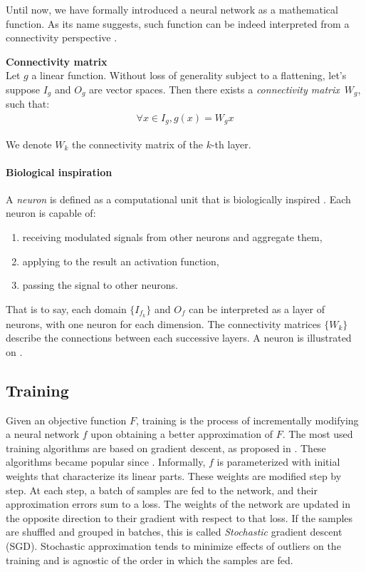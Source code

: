 Until now, we have formally introduced a neural network as a mathematical function. As its name suggests, such function can be indeed interpreted from a connectivity perspective \citep{lecun-87}.

\begin{definition}\textbf{Connectivity matrix}\\
Let $g$ a linear function. Without loss of generality subject to a flattening, let's suppose $I_g$ and $O_g$ are vector spaces. Then there exists a \emph{connectivity matrix}~$W_g$, such that:
\begin{gather*}
\forall x \in I_g, g(x) = W_g x
\end{gather*}
\end{definition}
We denote $W_k$ the connectivity matrix of the $k$-th layer.

\paragraph{Biological inspiration}
A \emph{neuron} is defined as a computational unit that is biologically inspired \citep{mcculloch1943logical}. Each neuron is capable of:
\begin{enumerate}
\item receiving modulated signals from other neurons and aggregate them,
\item applying to the result an activation function,
\item passing the signal to other neurons.\\
\end{enumerate}
That is to say, each domain $\{I_{f_k}\}$ and $O_f$ can be interpreted as a layer of neurons, with one neuron for each dimension. The connectivity matrices $\{W_k\}$ describe the connections between each successive layers.
A neuron is illustrated on .



\subsection{Training}
\label{sec:training}

Given an objective function $F$, training is the process of incrementally modifying a neural network $f$ upon obtaining a better approximation of $F$.
The most used training algorithms are based on gradient descent, as proposed in \citep{widrow1960adaptive}. These algorithms became popular since \citep{rumelhart1985learning}. Informally, $f$ is parameterized with initial weights that characterize its linear parts. These weights are modified step by step. At each step, a batch of samples are fed to the network, and their approximation errors sum to a loss. The weights of the network are updated in the opposite direction to their gradient with respect to that loss. If the samples are shuffled and grouped in batches, this is called \emph{Stochastic} gradient descent (SGD). Stochastic approximation \citep{robbins1985stochastic} tends to minimize effects of outliers on the training and is agnostic of the order in which the samples are fed.

